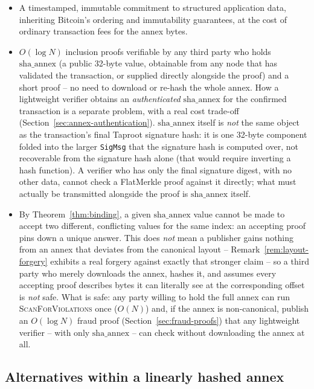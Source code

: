 \begin{itemize}
\item A timestamped, immutable commitment to structured application data,
  inheriting Bitcoin's ordering and immutability guarantees, at the cost of
  ordinary transaction fees for the annex bytes.
\item $O(\log N)$ inclusion proofs verifiable by any third party who holds
  $\mathrm{sha\_annex}$ (a public 32-byte value, obtainable from any node
  that has validated the transaction, or supplied directly alongside the
  proof) and a short proof -- no need to download or re-hash the whole
  annex. How a lightweight verifier obtains an \emph{authenticated}
  $\mathrm{sha\_annex}$ for the confirmed transaction is a separate
  problem, with a real cost trade-off
  (Section~\ref{sec:annex-authentication}).
  $\mathrm{sha\_annex}$ itself is \emph{not} the same object as the
  transaction's final Taproot signature hash: it is one 32-byte component
  folded into the larger \texttt{SigMsg} that the signature hash is
  computed over, not recoverable from the signature hash alone (that would
  require inverting a hash function). A verifier who has only the final
  signature digest, with no other data, cannot check a FlatMerkle proof
  against it directly; what must actually be transmitted alongside the
  proof is $\mathrm{sha\_annex}$ itself.
\item By Theorem~\ref{thm:binding}, a given $\mathrm{sha\_annex}$ value
  cannot be made to accept two different, conflicting values for the same
  index: an accepting proof pins down a unique answer. This does
  \emph{not} mean a publisher gains nothing from an annex that deviates
  from the canonical layout -- Remark~\ref{rem:layout-forgery} exhibits a
  real forgery against exactly that stronger claim -- so a third party who
  merely downloads the annex, hashes it, and assumes every accepting proof
  describes bytes it can literally see at the corresponding offset is
  \emph{not} safe. What is safe: any party willing to hold the full annex
  can run \textsc{ScanForViolations} once ($O(N)$) and, if the annex is
  non-canonical, publish an $O(\log N)$ fraud proof
  (Section~\ref{sec:fraud-proofs}) that any lightweight verifier -- with
  only $\mathrm{sha\_annex}$ -- can check without downloading the annex at
  all.
\end{itemize}

\subsection{Alternatives within a linearly hashed annex}
\label{sec:annex-alternatives}

